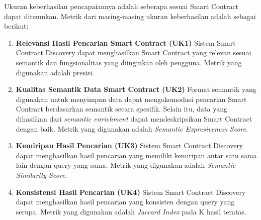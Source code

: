 
Ukuran keberhasilan pencapaiannya adalah seberapa sesuai Smart Contract dapat ditemukan. Metrik dari masing-masing ukuran keberhasilan adalah sebagai berikut:

\begin{enumerate}
	\item \textbf{Relevansi Hasil Pencarian Smart Contract (UK1)} \newline
	      Sistem Smart Contract Discovery dapat menghasilkan Smart Contract yang relevan sesuai semantik dan fungsionalitas yang diinginkan oleh pengguna. Metrik yang digunakan adalah presisi.

	\item \textbf{Kualitas Semantik Data Smart Contract (UK2)} \newline
	      Format semantik yang digunakan untuk menyimpan data dapat mengakomodasi pencarian Smart Contract berdasarkan semantik secara spesifik. Selain itu, data yang dihasilkan dari \textit{semantic enrichment} dapat mendeskripsikan Smart Contract dengan baik. Metrik yang digunakan adalah \textit{Semantic Expresiveness Score}.

	\item \textbf{Kemiripan Hasil Pencarian (UK3)} \newline
	      Sistem Smart Contract Discovery dapat menghasilkan hasil pencarian yang memiliki kemiripan antar satu sama lain dengan query yang sama. Metrik yang digunakan adalah \textit{Semantic Similarity Score}.

	\item \textbf{Konsistensi Hasil Pencarian (UK4)} \newline
	      Sistem Smart Contract Discovery dapat menghasilkan hasil pencarian yang konsisten dengan query yang serupa. Metrik yang digunakan adalah \textit{Jaccard Index} pada K hasil teratas.


\end{enumerate}
